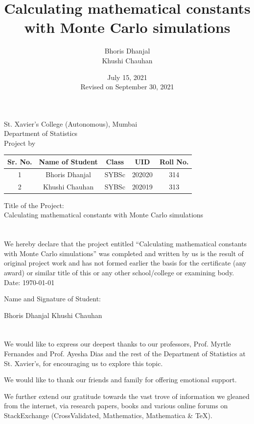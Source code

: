 \documentclass[12pt]{article}
\title{Calculating mathematical constants \\with Monte Carlo simulations}
\author{Bhoris Dhanjal\\ Khushi Chauhan }
\date{July 15, 2021\\ \small{Revised on September 30, 2021}}
\makeatletter
\numberwithin{equation}{section}
\newcommand\frontmatter{%
    \cleardoublepage
  \pagenumbering{roman}}
\makeatother
\begin{document}

\frontmatter
\begin{center}
    \large St. Xavier’s College (Autonomous), Mumbai\\
\large Department of Statistics\\
\large Project by\\
\begin{table}[h!]
\centering
\begin{tabular}{ccccc}
\hline
Sr. No. & Name of Student & Class & UID & Roll No. \\ \hline
1 & Bhoris Dhanjal & SYBSc & 202020 & 314 \\
2 & Khushi Chauhan & SYBSc & 202019 & 313 \\ \hline
\end{tabular}
\end{table}
Title of the Project:\\
Calculating mathematical constants with Monte Carlo simulations
\end{center}
\clearpage

\section*{}
\par We hereby declare that the project entitled “Calculating mathematical constants with Monte Carlo simulations” was completed and
written by us is the result of original project work and has not formed earlier the basis for
the certificate (any award) or similar title of this or any other school/college or examining
body.
\vfill
Date: \today \par
Name and Signature of Student:\\
\par Bhoris Dhanjal \hfill Khushi Chauhan\\
\clearpage

\section*{}
We would like to express our deepest thanks to our professors, Prof. Myrtle Fernandes and Prof. Ayesha Dias and the rest of the Department of Statistics at St. Xavier's, for encouraging us to explore this topic.
\par We would like to thank our friends and family for offering emotional support.
\par We further extend our gratitude towards the vast trove of information we gleaned from the internet, via research papers, books and various online forums on StackExchange (CrossValidated, Mathematics, Mathematica \& TeX).
\clearpage
\tableofcontents
\end{document}

